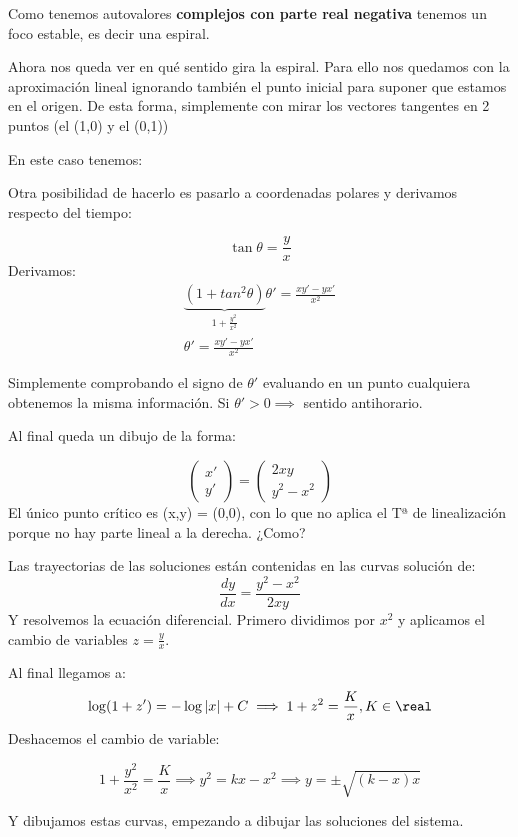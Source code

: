 \documentclass[nochap]{apuntes}
\begin{document}
\begin{problem}[1]
Como tenemos autovalores \textbf{complejos con parte real negativa} tenemos un foco estable, es decir una espiral. 

Ahora nos queda ver en qué sentido gira la espiral. Para ello nos quedamos con la aproximación lineal ignorando también el punto inicial para suponer que estamos en el origen. De esta forma, simplemente con mirar los vectores tangentes en 2 puntos (el (1,0) y el (0,1))

En este caso tenemos:
\begin{figure}[hbt]
\centering
{}
\end{figure}
Otra posibilidad de hacerlo es pasarlo a coordenadas polares y derivamos respecto del tiempo:


\[\tan\theta = \frac{y}{x}\]
Derivamos:
\begin{gather*}
\underbrace{(1+tan^2\theta)}_{1+\frac{y^2}{x^2}}\theta' = \frac{xy'-yx'}{x^2}\\
\theta' =\frac{xy'-yx'}{x^2}
\end{gather*}

Simplemente comprobando el signo de $\theta'$ evaluando en un punto cualquiera obtenemos la misma información.  Si $\theta'>0\implies$ sentido antihorario. 

Al final queda un dibujo de la forma:

\begin{figure}[hbt]
\centering
{}
\end{figure}


\end{problem}


\begin{problem}[2]
\[\begin{pmatrix}
x'\\y'
\end{pmatrix} = \begin{pmatrix}
2xy\\y^2-x^2
\end{pmatrix}\]
\solution
El único punto crítico es (x,y) = (0,0), con lo que no aplica el Tª de linealización porque no hay parte lineal a la derecha. ¿Como?

Las trayectorias de las soluciones están contenidas en las curvas solución de:
\[\frac{dy}{dx} = \frac{y^2-x^2}{2xy}\]
Y resolvemos la ecuación diferencial. Primero dividimos por $x^2$ y aplicamos el cambio de variables $z=\frac{y}{x}$.

Al final llegamos a:
\[\log(1+z') = -\log|x| + C \implies 1+z^2 = \frac{K}{x},K\in\real\]
Deshacemos el cambio de variable:

\[1+\frac{y^2}{x^2} = \frac{K}{x}\implies y^2 = kx-x^2 \implies y = \pm \sqrt{(k-x)x}\]

Y dibujamos estas curvas, empezando a dibujar las soluciones del sistema.

\end{problem}
\end{document}
